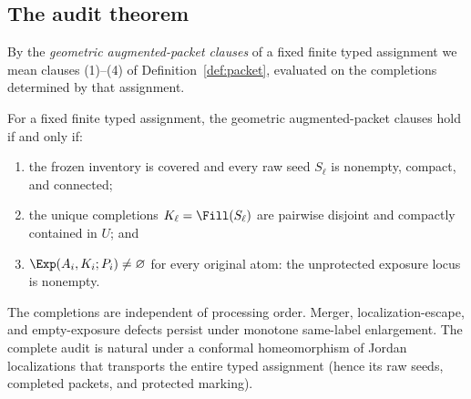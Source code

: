 \subsection{The audit theorem}\label{subsec:E-audit-thm}

By the \emph{geometric augmented-packet clauses} of a fixed finite typed assignment
we mean clauses (1)--(4) of Definition~\ref{def:packet}, evaluated on the completions
determined by that assignment.

\begin{theorem}\label{thm:audit}
For a fixed finite typed assignment, the geometric augmented-packet clauses hold if
and only if:
\begin{enumerate}
\item the frozen inventory is covered and every raw seed $S_\ell$ is
nonempty, compact, and connected;
\item the unique completions $K_\ell=\Fill(S_\ell)$ are pairwise disjoint and
compactly contained in $U$; and
\item $\Exp(A_i,K_i;P_i)\neq\varnothing$ for every original atom: the
unprotected exposure locus is nonempty.
\end{enumerate}
The completions are independent of processing order. Merger, localization-escape, and
empty-exposure defects persist under monotone same-label enlargement. The complete
audit is natural under a conformal homeomorphism of Jordan localizations that
transports the entire typed assignment (hence its raw seeds, completed packets,
and protected marking).
\end{theorem}

